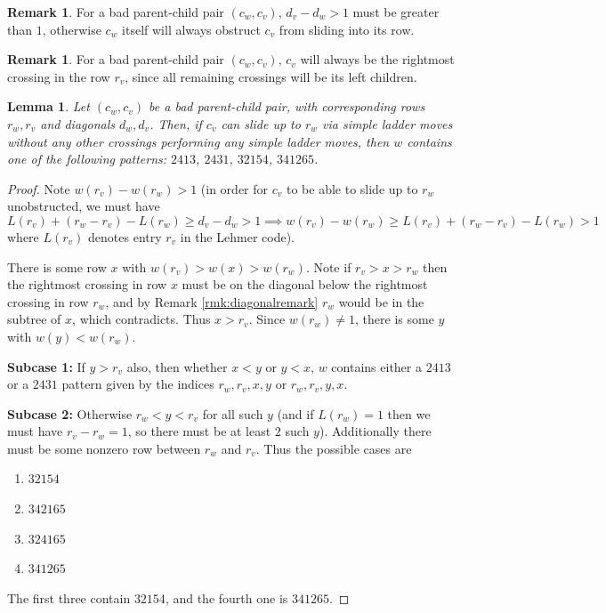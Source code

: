 \documentclass{article}
\newtheorem{lemma}[theorem]{Lemma}
\theoremstyle{definition} %
\newtheorem{remark}[theorem]{Remark}
\begin{document}
\begin{remark}
For a bad parent-child pair $(c_w, c_v)$, $d_v-d_w>1$ must be greater than $1$, otherwise $c_w$ itself will always obstruct $c_v$ from sliding into its row. 
\end{remark}
\vspace{1em}

\begin{remark}
For a bad parent-child pair $(c_w, c_v)$, $c_v$ will always be the rightmost crossing in the row $r_v$, since all remaining crossings will be its left children.
\end{remark}
\vspace{1em}

\begin{lemma}\label{lemma:sufficientcase1}
    Let $(c_w, c_v)$ be a bad parent-child pair, with corresponding rows $r_w, r_v$ and diagonals $d_w, d_v$. Then, if $c_v$ can slide up to $r_w$ via simple ladder moves without any other crossings performing any simple ladder moves, then $w$ contains one of the following patterns: $2413$, $2431$, $32154$, $341265$.
\end{lemma}
\begin{proof}
    Note $w(r_v)-w(r_w)>1$ (in order for $c_v$ to be able to slide up to $r_w$ unobstructed, we must have \[L(r_v) + (r_w-r_v) - L(r_w) \ge d_v-d_w>1 \implies w(r_v)-w(r_w)\ge L(r_v)+(r_w-r_v)-L(r_w)> 1\]
    where $L(r_v)$ denotes entry $r_v$ in the Lehmer code). 

    There is some row $x$ with $w(r_v)>w(x)>w(r_w)$. Note if $r_v>x>r_w$ then the rightmost crossing in row $x$ must be on the diagonal below the rightmost crossing in row $r_w$, and by Remark \ref{rmk:diagonalremark} $r_w$ would be in the subtree of $x$, which contradicts. Thus $x>r_v$. Since $w(r_w) \neq 1$, there is some $y$ with $w(y)<w(r_w)$. 
    
    \textbf{Subcase 1:} If $y>r_v$ also, then whether $x< y$ or $y < x$, $w$ contains either a $2413$ or a $2431$ pattern given by the indices $r_w, r_v, x,y$ or $r_w,r_v,y,x$.
    
    \textbf{Subcase 2:} Otherwise $r_w<y<r_v$ for all such $y$ (and if $L(r_w)=1$ then we must have $r_v-r_w=1$, so there must be at least $2$ such $y$). Additionally there must be some nonzero row between $r_w$ and $r_v$. Thus the possible cases are
    \begin{enumerate}
        \item $32154$
        \item $342165$
        \item $324165$
        \item $341265$
    \end{enumerate}
    The first three contain $32154$, and the fourth one is $341265$.
\end{proof}
\end{document}
